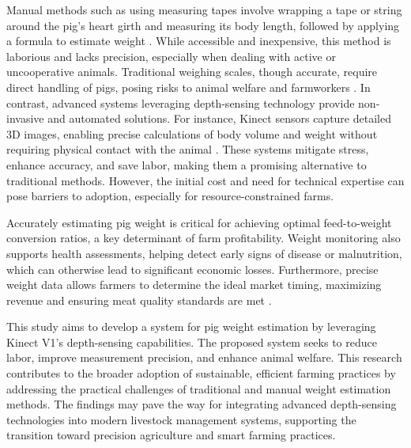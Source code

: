 {Manual methods such as using measuring tapes involve wrapping a tape or string around the pig's heart girth and measuring its body length, followed by applying a formula to estimate weight \citep{ThePigSite}. While accessible and inexpensive, this method is laborious and lacks precision, especially when dealing with active or uncooperative animals. Traditional weighing scales, though accurate, require direct handling of pigs, posing risks to animal welfare and farmworkers \citep{dickinson2013automated}. In contrast, advanced systems leveraging depth-sensing technology provide non-invasive and automated solutions. For instance, Kinect sensors capture detailed 3D images, enabling precise calculations of body volume and weight without requiring physical contact with the animal \citep{pezzuolo2018barn}. These systems mitigate stress, enhance accuracy, and save labor, making them a promising alternative to traditional methods. However, the initial cost and need for technical expertise can pose barriers to adoption, especially for resource-constrained farms.

Accurately estimating pig weight is critical for achieving optimal feed-to-weight conversion ratios, a key determinant of farm profitability. Weight monitoring also supports health assessments, helping detect early signs of disease or malnutrition, which can otherwise lead to significant economic losses. Furthermore, precise weight data allows farmers to determine the ideal market timing, maximizing revenue and ensuring meat quality standards are met \citep{terence2024systematic}.

This study aims to develop a system for pig weight estimation by leveraging Kinect V1's depth-sensing capabilities. The proposed system seeks to reduce labor, improve measurement precision, and enhance animal welfare. This research contributes to the broader adoption of sustainable, efficient farming practices by addressing the practical challenges of traditional and manual weight estimation methods. The findings may pave the way for integrating advanced depth-sensing technologies into modern livestock management systems, supporting the transition toward precision agriculture and smart farming practices.

 


}
